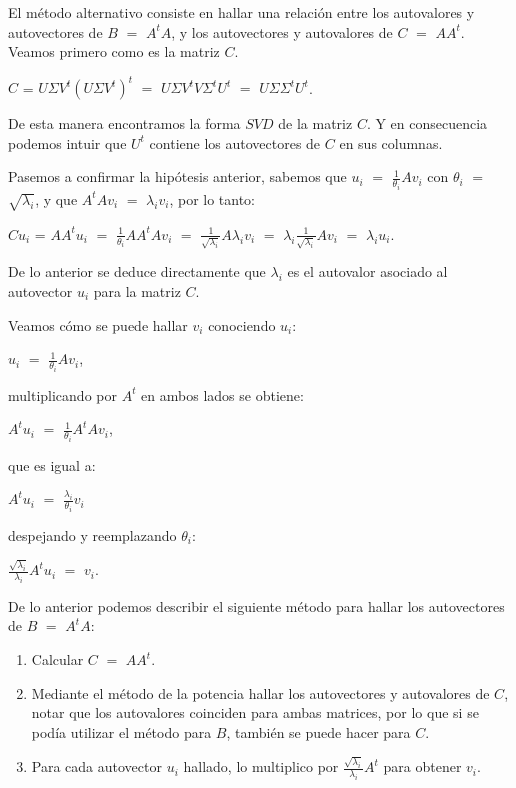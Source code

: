 El método alternativo consiste en hallar una relación entre los autovalores y autovectores de $B$ $=$ $A^{t} A$, y los autovectores y autovalores de $C$ $=$ $A A^{t}$.
Veamos primero como es la matriz $C$.

$C$ = $U \Sigma V^t (U \Sigma V^t)^{t}$ $=$ $U \Sigma V^t V \Sigma^{t} U^{t} $ $=$ $U \Sigma \Sigma^{t} U^{t}$. 

De esta manera encontramos la forma $SVD$ de la matriz $C$. Y en consecuencia podemos intuir que $U^{t}$ contiene los autovectores de $C$ en sus columnas.

Pasemos a confirmar la hipótesis anterior, sabemos que $u_{i}$ $=$ $\frac{1}{ \theta_{i} } A v_{i}$ con $\theta_{i}$ $=$ $\sqrt{ \lambda_{i} }$, y que $A^{t} A v_{i}$ $=$ $\lambda_{i} v_{i}$, por lo tanto:

$C u_{i}$ = $A A^{t} u_{i}$ $=$ $\frac{1}{ \theta_{i} } A A^{t}  A v_{i}$ $=$ $ \frac{ 1 }{ \sqrt{ \lambda_{i} } } A  \lambda_{i} v_{i}$ $=$ $ \lambda_{i} \frac{ 1 }{ \sqrt{ \lambda_{i} } } A  v_{i}$ $=$ $\lambda_{i} u_{i}$.

De lo anterior se deduce directamente que $\lambda_{i}$ es el autovalor asociado al autovector $u_{i}$ para la matriz $C$.

Veamos cómo se puede hallar $v_{i}$ conociendo $u_{i}$:

$u_{i}$ $=$ $\frac{1}{ \theta_{i} } A v_{i}$, 

multiplicando por $A^{t}$ en ambos lados se obtiene:

$A^{t} u_{i}$ $=$ $ \frac{1}{ \theta_{i} } A^{t} A v_{i}$, 

que es igual a: 

$A^{t} u_{i}$ $=$ $\frac{\lambda_{i}}{ \theta_{i} }  v_{i}$ 

despejando y reemplazando $\theta_{i}$:

$\frac{ \sqrt{\lambda_{i} } }{ \lambda_{i} }  A^{t} u_{i}$ $=$ $v_{i}$.

De lo anterior podemos describir el siguiente método para hallar los autovectores de $B$ $=$ $A^{t} A$:
\begin{enumerate}
\item Calcular $C$ $=$ $A A^{t}$.
\item Mediante el método de la potencia hallar los autovectores y autovalores de $C$, notar que los autovalores coinciden para ambas matrices, por lo que si  se podía utilizar el método para $B$, también se puede hacer para $C$.
\item Para cada autovector $u_{i}$ hallado, lo multiplico por $\frac{ \sqrt{\lambda_{i} } }{ \lambda_{i} }  A^{t}$ para obtener $v_{i}$.
\end{enumerate}

